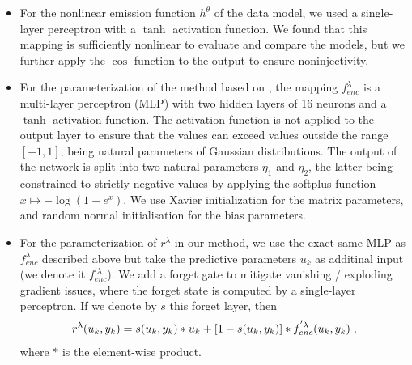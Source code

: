 \documentclass{article}
\begin{document}
\begin{itemize}
    \item For the nonlinear emission function $h^\theta$ of the data model, we used a single-layer perceptron with a $\tanh$ activation function. We found that this mapping is sufficiently nonlinear to evaluate and compare the models, but we further apply the $\cos$ function to the output to ensure noninjectivity. 
    
    \item For the parameterization of the method based on \cite{johnson2016}, the mapping $f_{enc}^\lambda$ is a multi-layer perceptron (MLP) with two hidden layers of 16 neurons and a $\tanh$ activation function. The activation function is not applied to the output layer to ensure that the values can exceed values outside the range $[-1,1]$, being natural parameters of Gaussian distributions. The output of the network is split into two natural parameters $\eta_1$ and $\eta_2$, the latter being constrained to strictly negative values by applying the softplus function $x \mapsto -\log(1 +e^x)$. We use Xavier initialization for the matrix parameters, and random normal initialisation for the bias parameters. 
    \item For the parameterization of $r^\lambda$ in our method, we use the exact same MLP as $f_{enc}^\lambda$ described above but take the predictive parameters $u_k$ as additinal input (we denote it $f^{'\lambda}_{enc}$). We add a forget gate to mitigate vanishing / exploding gradient issues, where the forget state is computed by a single-layer perceptron. If we denote by $s$ this forget layer, then $$r^\lambda(u_k,y_k) = s(u_k,y_k) * u_k + \left[1 - s(u_k, y_k)\right] * f^{'\lambda}_{enc}(u_k, y_k)\;,$$ where $*$ is the element-wise product.
\end{itemize}
\end{document}
